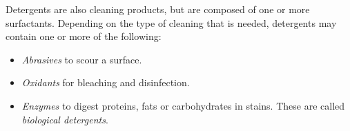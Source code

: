 \begin{enumerate}

Detergents are also cleaning products, but are composed of one or more surfactants. Depending on the type of cleaning that is needed, detergents may contain one or more of the following:

\begin{itemize}
\item{\textit{Abrasives} to scour a surface.}
\item{\textit{Oxidants} for bleaching and disinfection.}
\item{\textit{Enzymes} to digest proteins, fats or carbohydrates in stains. These are called \textit{biological detergents}.}
\end{itemize}

\end{enumerate}

